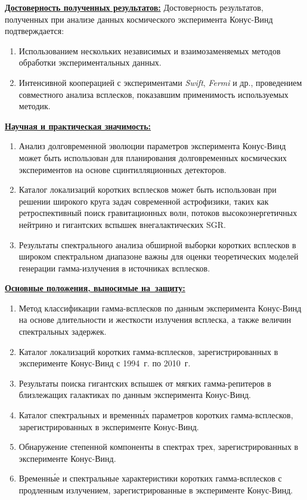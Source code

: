 \underline{\textbf{Достоверность полученных результатов:}}
Достоверность результатов, полученных при анализе данных космического
эксперимента Конус-Винд подтверждается:
\begin{enumerate}
\item Использованием нескольких независимых и взаимозаменяемых методов обработки экспериментальных данных.
\item Интенсивной кооперацией с экспериментами \textit{Swift}, \textit{Fermi} и др.,
проведением совместного анализа всплесков, показавшим применимость используемых методик.
\end{enumerate}

\underline{\textbf{Научная и практическая значимость:}} 
\begin{enumerate}
\item Анализ долговременной эволюции параметров эксперимента Конус-Винд может быть использован
 для планирования долговременных космических экспериментов на основе сцинтилляционных детекторов.
\item Каталог локализаций коротких всплесков может быть использован при решении 
 широкого круга задач современной астрофизики, таких как ретроспективный поиск гравитационных волн, потоков 
 высокоэнергетичных нейтрино и гигантских вспышек внегалактических SGR.
\item Результаты спектрального анализа обширной выборки коротких всплесков 
 в широком спектральном диапазоне важны для оценки теоретических 
 моделей генерации гамма-излучения в источниках всплесков.
\end{enumerate}

\clearpage

\underline{\textbf{Основные положения, выносимые на~защиту:}}
\begin{enumerate}
\item Метод классификации гамма-всплесков по данным эксперимента Конус-Винд на основе
    длительности и жесткости излучения всплеска, а также величин спектральных задержек.
\item Каталог локализаций коротких гамма-всплесков, зарегистрированных в эксперименте
    Конус-Винд с 1994~г. по 2010~г.
\item Результаты поиска гигантских вспышек от мягких гамма-репитеров 
    в близлежащих галактиках по данным эксперимента Конус-Винд. 
\item Каталог спектральных и временн\'{ы}х параметров коротких гамма-всплесков, 
    зарегистрированных в эксперименте Конус-Винд.
\item Обнаружение степенной компоненты в спектрах трех, 
    зарегистрированных в эксперименте Конус-Винд.
\item Временн\'{ы}е и спектральные характеристики коротких гамма-всплесков 
    с продленным излучением, зарегистрированные в эксперименте Конус-Винд.
\end{enumerate}


